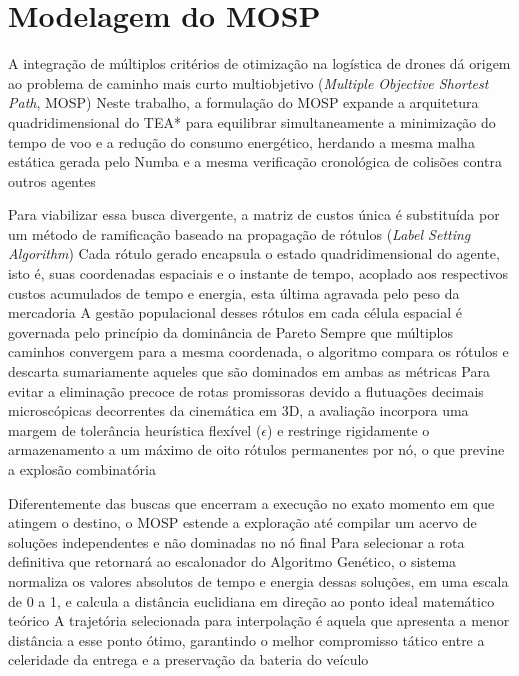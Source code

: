 \section{Modelagem do MOSP}\label{sec:dev-mosp}

A integração de múltiplos critérios de otimização na logística de drones dá origem ao problema de caminho mais curto multiobjetivo (\textit{Multiple Objective Shortest Path}, MOSP) %
Neste trabalho, a formulação do MOSP expande a arquitetura quadridimensional do TEA* para equilibrar simultaneamente a minimização do tempo de voo e a redução do consumo energético, herdando a mesma malha estática gerada pelo Numba e a mesma verificação cronológica de colisões contra outros agentes %

Para viabilizar essa busca divergente, a matriz de custos única é substituída por um método de ramificação baseado na propagação de rótulos (\textit{Label Setting Algorithm}) %
Cada rótulo gerado encapsula o estado quadridimensional do agente, isto é, suas coordenadas espaciais e o instante de tempo, acoplado aos respectivos custos acumulados de tempo e energia, esta última agravada pelo peso da mercadoria %
A gestão populacional desses rótulos em cada célula espacial é governada pelo princípio da dominância de Pareto %
Sempre que múltiplos caminhos convergem para a mesma coordenada, o algoritmo compara os rótulos e descarta sumariamente aqueles que são dominados em ambas as métricas %
Para evitar a eliminação precoce de rotas promissoras devido a flutuações decimais microscópicas decorrentes da cinemática em 3D, a avaliação incorpora uma margem de tolerância heurística flexível ($\epsilon$) e restringe rigidamente o armazenamento a um máximo de oito rótulos permanentes por nó, o que previne a explosão combinatória %

Diferentemente das buscas que encerram a execução no exato momento em que atingem o destino, o MOSP estende a exploração até compilar um acervo de soluções independentes e não dominadas no nó final %
Para selecionar a rota definitiva que retornará ao escalonador do Algoritmo Genético, o sistema normaliza os valores absolutos de tempo e energia dessas soluções, em uma escala de 0 a 1, e calcula a distância euclidiana em direção ao ponto ideal matemático teórico %
A trajetória selecionada para interpolação é aquela que apresenta a menor distância a esse ponto ótimo, garantindo o melhor compromisso tático entre a celeridade da entrega e a preservação da bateria do veículo %

